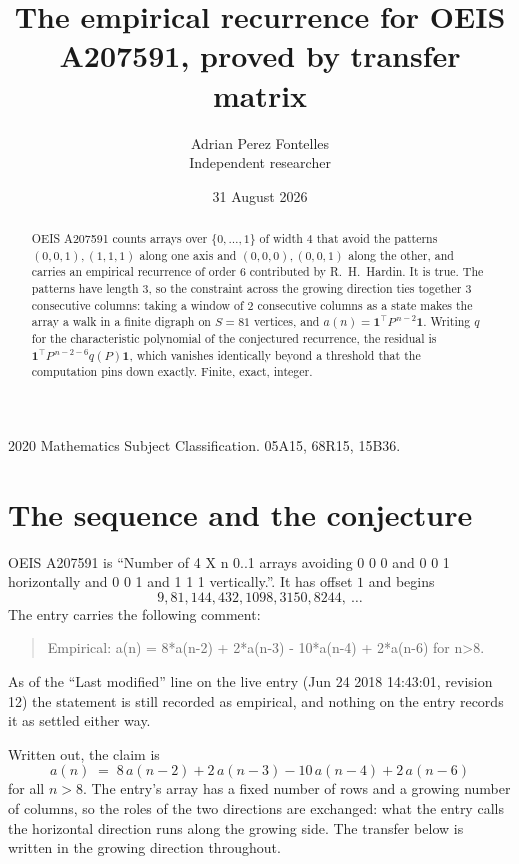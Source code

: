 \documentclass[11pt,a4paper]{article}
\title{The empirical recurrence for OEIS A207591, proved by transfer matrix}
\author{Adrian Perez Fontelles\\ \small Independent researcher}
\date{31 August 2026}
\theoremstyle{plain}
\theoremstyle{definition}
\begin{document}
\maketitle

\begin{abstract}
OEIS A207591 counts arrays over $\{0,\dots,1\}$ of width $4$ that avoid the patterns
$(0,0,1), (1,1,1)$ along one axis and $(0,0,0), (0,0,1)$ along the other, and carries an empirical recurrence of
order $6$ contributed by R.~H.~Hardin. It is true. The patterns have length $3$, so
the constraint across the growing direction ties together $3$ consecutive columns: taking a
window of $2$ consecutive columns as a state makes the array a walk in a finite digraph
on $S=81$ vertices, and $a(n)=\mathbf{1}^{\!\top}P^{\,n-2}\mathbf{1}$. Writing $q$
for the characteristic polynomial of the conjectured recurrence, the residual is
$\mathbf{1}^{\!\top}P^{\,n-2-6}q(P)\mathbf{1}$, which vanishes identically
beyond a threshold that the computation pins down exactly. Finite, exact, integer.
\end{abstract}

\noindent\small 2020 Mathematics Subject Classification. 05A15, 68R15, 15B36.\normalsize

\section{The sequence and the conjecture}

OEIS A207591 is ``Number of 4 X n 0..1 arrays avoiding 0 0 0 and 0 0 1 horizontally and 0 0 1 and 1 1 1 vertically.''. It has offset
$1$ and begins
\[
9, 81, 144, 432, 1098, 3150, 8244,\ \dots
\]
The entry carries the following comment:
\begin{quote}\small
Empirical: a(n) = 8*a(n-2) + 2*a(n-3) - 10*a(n-4) + 2*a(n-6) for n>8.
\end{quote}
As of the ``Last modified'' line on the live entry (Jun 24 2018 14:43:01, revision
12) the statement is still recorded as empirical, and nothing on the entry
records it as settled either way.

Written out, the claim is
\begin{equation}\label{eq:conj}
a(n)\;=\;8\,a(n-2) + 2\,a(n-3) - 10\,a(n-4) + 2\,a(n-6)
\end{equation}
for all $n>8$. The entry's array has a fixed number of rows and a growing number of
columns, so the roles of the two directions are exchanged: what the entry calls the
horizontal direction runs along the growing side. The transfer below is written in the
growing direction throughout.
\end{document}
